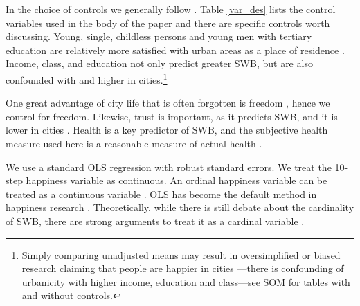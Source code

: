 \documentclass[11pt, letterpaper]{article}
\begin{document}




 
In the choice of controls we generally follow \citet{aok20}. Table \ref{var_des} lists the control variables used in the body of the
paper and there are specific controls worth discussing.
%
 Young, single, childless persons and young men with tertiary education are
 relatively more satisfied with urban areas as a place of residence \citep{anon-regional-studies-19}.
Income, class,  and education  not only predict greater
 SWB, but are also confounded with and higher in cities.\footnote{Simply comparing
   unadjusted means may result in oversimplified or biased research claiming
   that people are happier in cities  \citep[e.g.,][]{burger20}---there is
   confounding of urbanicity with higher income, education and class---see SOM for tables with and without controls.} 

One great advantage of city life that is often forgotten is freedom %
 \citep[%
 ]{park84}, %
 hence we control for freedom. 
% 
Likewise, trust is important, as it predicts SWB, and it is lower in cities
 \citep{milgram70}.
%
Health is a key predictor of SWB, and the subjective health measure used here is a reasonable measure of actual health \citep{subramanian09b}.

We use a standard OLS regression with robust standard errors.  We treat the 10-step
happiness variable as continuous. An ordinal happiness variable can be treated as a
continuous variable \citep{carbonell04}.
%
OLS has become the default method in happiness research
\citep{blanchflower11}. Theoretically, while there is still debate about the
cardinality of SWB, there are strong arguments to treat it as a cardinal
variable \citep{ng96,ng97}. 
\end{document}
